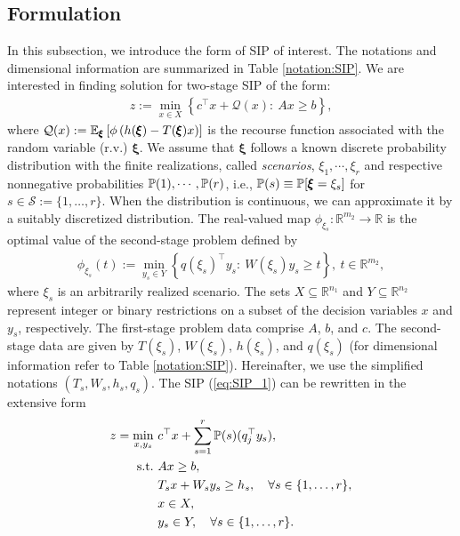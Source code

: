\subsection{Formulation}
In this subsection, we introduce the form of SIP of interest. The notations and dimensional information are summarized in Table \ref{notation:SIP}. We are interested in finding solution for two-stage SIP of the form: 
\begin{align}
z:=\min_{x\in X}{\left\{c^\top x + \mathcal{Q}(x):\ Ax\ge b\right\}}, \label{eq:SIP_1}
\end{align}
where $\mathcal{Q}(x):=\operatorname*{\mathbb{E}}_{\pmb{\xi}}\left[ \phi\left( h(\pmb{\xi})-T(\pmb{\xi})x \right) \right]$ is the recourse function associated with the random variable (r.v.) $\pmb{\xi}$. We assume that $\pmb{\xi}$ follows a known discrete probability distribution with the finite realizations, called \textit{scenarios}, $\xi_1,\cdots,\xi_r$ and respective nonnegative probabilities $\operatorname*{\mathbb{P}}(1),\cdots,\operatorname*{\mathbb{P}}(r)$, i.e., $\operatorname*{\mathbb{P}}(s)\equiv\operatorname*{\mathbb{P}}[\pmb{\xi}=\xi_s]$ for $s\in\mathcal{S}:=\{1,\ldots,r\}$. When the distribution is continuous, we can approximate it by a suitably discretized distribution. The real-valued map $\phi_{\xi_s}:\mathbb{R}^{m_2}\to\mathbb{R}$ is the optimal value of the second-stage problem defined by
\begin{align}
\phi_{\xi_s}(t):=\min_{y_s\in Y}\left\{ q(\xi_s)^\top y_s:\ W(\xi_s)y_s \ge t \right\},\ t\in\mathbb{R}^{m_2},
\end{align}
where $\xi_s$ is an arbitrarily realized scenario.
The sets $X\subseteq \mathbb{R}^{n_1}$ and $Y\subseteq\mathbb{R}^{n_2}$ represent integer or binary restrictions on a subset of the decision variables $x$ and $y_s$, respectively. 
The first-stage problem data comprise $A$, $b$, and $c$. The second-stage data are given by $T(\xi_s)$, $W(\xi_s)$, $h(\xi_s)$, and $q(\xi_s)$ (for dimensional information refer to Table \ref{notation:SIP}). Hereinafter, we use the simplified notations $(T_s,W_s,h_s,q_s)$.
The SIP (\ref{eq:SIP_1}) can be rewritten in the extensive form
\begin{subequations}
\begin{align}
z=\min_{x,y_s}\ &c^{\top}x + \sum_{s=1}^{r}\operatorname*{\mathbb{P}}(s) (q_j^{\top}y_s), \\ 
\mathrm{s.t.}\ &Ax\ge b,  \\
	&T_s x+W_s y_s\ge h_s,\quad\forall s\in\{1,\ldots,r\},\\
	&x\in X, \\
	&y_s \in Y,\quad\forall s\in\{1,\ldots,r\}.
\end{align}
\end{subequations}

